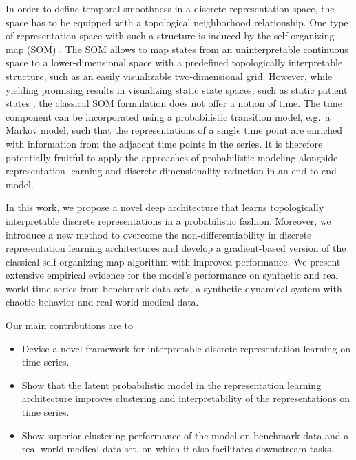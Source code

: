 In order to define temporal smoothness in a discrete representation space, the space has to be equipped with a topological neighborhood relationship.
One type of representation space with such a structure is induced by the self-organizing map (SOM) \citep{Kohonen1998}.
The SOM allows to map states from an uninterpretable continuous space to a lower-dimensional space with a predefined topologically interpretable structure, such as an easily visualizable two-dimensional grid.
However, while yielding promising results in visualizing static state spaces, such as static patient states \citep{Tirunagari2015}, the classical SOM formulation does not offer a notion of time.
The time component can be incorporated using a probabilistic transition model, e.g.\ a Markov model, such that the representations of a single time point are enriched with information from the adjacent time points in the series.
It is therefore potentially fruitful to apply the approaches of probabilistic modeling alongside representation learning and discrete dimensionality reduction in an end-to-end model.

In this work, we propose a novel deep architecture that learns topologically interpretable discrete representations in a probabilistic fashion.
Moreover, we introduce a new method to overcome the non-differentiability in discrete representation learning architectures and develop a gradient-based version of the classical self-organizing map algorithm with improved performance.
We present extensive empirical evidence for the model's performance on synthetic and real world time series from benchmark data sets, a synthetic dynamical system with chaotic behavior and real world medical data.

Our main contributions are to

\begin{itemize}
	\item Devise a novel framework for interpretable discrete representation learning on time series.
	\item Show that the latent probabilistic model in the representation learning architecture improves clustering and interpretability of the representations on time series.
	\item Show superior clustering performance of the model on benchmark data and a real world medical data set, on which it also facilitates downstream tasks.
\end{itemize}